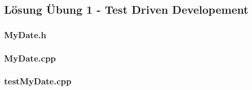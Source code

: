 \setcounter{section}{1}
\setcounter{subsection}{0}
%
\subsection{Lösung Übung 1 - Test Driven Developement}
\subsubsection{MyDate.h}

\newpage
\subsubsection{MyDate.cpp}

\subsubsection{testMyDate.cpp}


%
%
%
%

%

